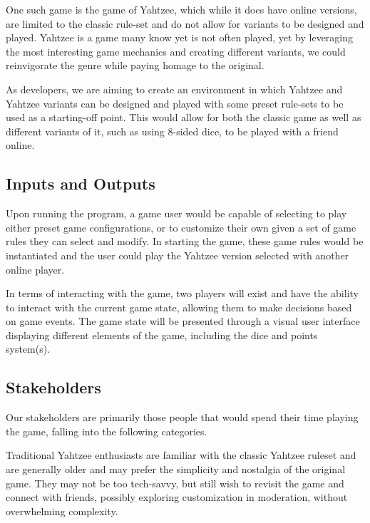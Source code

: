 \documentclass{article}
\begin{document}
One such game is the game of Yahtzee, which while it does have online versions, are limited to the classic rule-set and do not allow for variants to be designed and played.
Yahtzee is a game many know yet is not often played, yet by leveraging the most interesting game mechanics and creating different variants, we could reinvigorate the genre while paying homage to the original.

As developers, we are aiming to create an environment in which Yahtzee and Yahtzee variants can be designed and played with some preset rule-sets to be used as a starting-off point. This would allow for both the classic game as well as different variants of it, such as using 8-sided dice, to be played with a friend online.

\subsection{Inputs and Outputs}

Upon running the program, a game user would be capable of selecting to play either preset game configurations, or to customize their own given a set of game rules they can select and modify. In starting the game, these game rules would be instantiated and the user could play the Yahtzee version selected with another online player.

In terms of interacting with the game, two players will exist and have the ability to interact with the current game state, allowing them to make decisions based on game events. The game state will be presented through a visual user interface displaying different elements of the game, including the dice and points system(s).

\subsection{Stakeholders}

Our stakeholders are primarily those people that would spend their time playing the game, falling into the following categories.

Traditional Yahtzee enthusiasts are familiar with the classic Yahtzee ruleset and are generally older and may prefer the simplicity and nostalgia of the original game. They may not be too tech-savvy, but still wish to revisit the game and connect with friends, possibly exploring customization in moderation, without overwhelming complexity.
\end{document}
